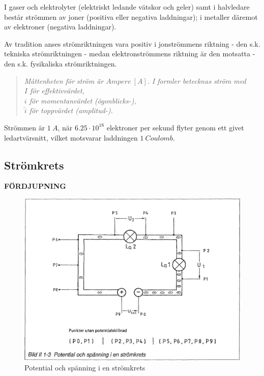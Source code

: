 I gaser och elektrolyter (elektriskt ledande vätskor och geler) samt i
halvledare består strömmen av joner (positiva eller negativa laddningar);
i metaller däremot av elektroner (negativa laddningar).

Av tradition anses strömriktningen vara positiv i jonströmmens riktning - den
s.k. tekniska strömriktningen - medan elektronströmmens riktning är den
motsatta - den s.k. fysikaliska strömriktningen.

\begin{quote}
\emph{Måttenheten för ström är \(Ampere\ [A]\).}
\emph{I formler betecknas ström med} \\
\emph{\(I\) för effektivvärdet,} \\
\emph{\(i\) för momentanvärdet (ögonblicks-),} \\
\emph{\(\hat{i}\) för toppvärdet (amplitud-).}
\end{quote}

Strömmen är \(1\ A\), när \(6.25 \cdot 10^{18}\) elektroner per sekund flyter genom ett givet
ledartvärsnitt, vilket motsvarar laddningen \(1\ Coulomb\).

\subsection{Strömkrets}
\textbf{FÖRDJUPNING}

\begin{figure}
\begin{center}
\includegraphics[width=14cm]{images/bild_2_1-03}
\caption{Potential och spänning i en strömkrets}
\label{fig:BildII1-3}
\end{center}
\end{figure}

